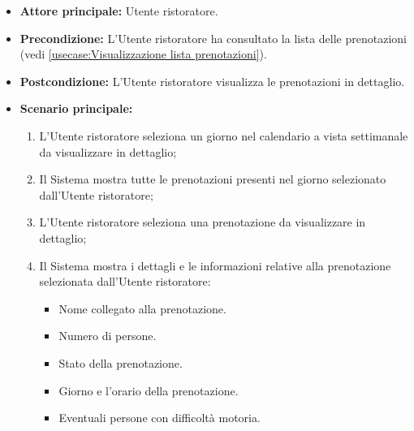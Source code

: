 \label{usecase:Visualizza dettaglio lista prenotazioni}
\begin{itemize}
	\item \textbf{Attore principale:} Utente ristoratore.

	\item \textbf{Precondizione:} L'Utente ristoratore ha consultato la lista delle prenotazioni (vedi \autoref{usecase:Visualizzazione lista prenotazioni}).

	\item \textbf{Postcondizione:} L'Utente ristoratore visualizza le prenotazioni in dettaglio.


	\item \textbf{Scenario principale:}
	      \begin{enumerate}
		      \item L'Utente ristoratore seleziona un giorno nel calendario a vista settimanale da visualizzare in dettaglio;
		      \item Il Sistema mostra tutte le prenotazioni presenti nel giorno selezionato dall'Utente ristoratore;

		      \item L'Utente ristoratore seleziona una prenotazione da visualizzare in dettaglio;
		      \item Il Sistema mostra i dettagli e le informazioni relative alla prenotazione selezionata dall'Utente ristoratore:
		            \begin{itemize}
			            \item Nome collegato alla prenotazione.
			            \item Numero di persone.
			            \item Stato della prenotazione.
			            \item Giorno e l'orario della prenotazione.
			            \item Eventuali persone con difficoltà motoria.
		            \end{itemize}

	      \end{enumerate}
\end{itemize}
